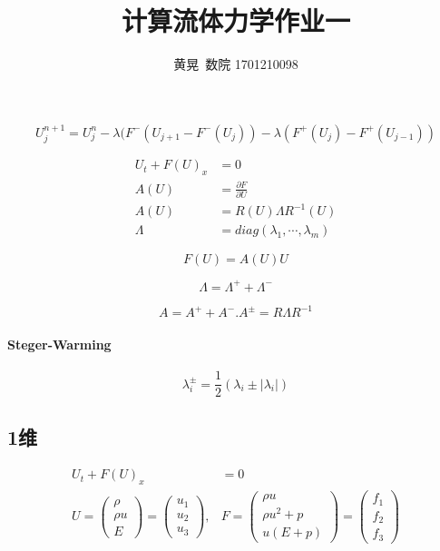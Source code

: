 \documentclass[UTF8]{ctexart}
\author{黄晃\ 数院 1701210098 }
\title{计算流体力学作业一}
\begin{document}
  \maketitle

\section{}
  $$
  U_j^{n+1}=U_j^n-\lambda(F^-(U_{j+1}-F^-(U_j))-\lambda(F^+(U_j)-F^+(U_{j-1}))
  $$


  \begin{equation*}
  \begin{split}
      U_t+F(U)_x&=0 \\
    A(U)&=\frac{\partial F}{\partial U} \\
    A(U)&=R(U)\Lambda R^{-1}(U)\\
    \Lambda &= diag(\lambda_1,\cdots,\lambda_m)
  \end{split}
  \end{equation*}

$$
F(U)=A(U)U
$$

$$
\Lambda = \Lambda^++\Lambda^-
$$



$$
A=A^++A^-.A^{\pm}=R\Lambda R^{-1}
$$

\paragraph{Steger-Warming}
$$
\lambda_i^{\pm}=\frac{1}{2}(\lambda_i\pm |\lambda_i|)
$$


\subsection{1维}
\begin{equation*}
  \begin{split}
     U_t+F(U)_x&=0 \\
     U=\left( \begin{matrix}
                \rho \\
                \rho u \\
                E
              \end{matrix}\right)=\left( \begin{matrix}
                u_1\\
                 u_2 \\
                u_3
              \end{matrix}\right) , & F=\left( \begin{matrix}
                \rho u \\
                \rho u^2+p \\
                u(E+p)
              \end{matrix}\right) =\left( \begin{matrix}
                f_1\\
                 f_2 \\
                f_3
                \end{matrix}
                \right)
  \end{split}
\end{equation*}
\end{document}
